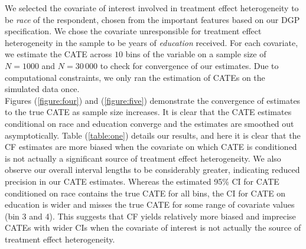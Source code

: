\documentclass[12pt]{article}
\begin{document}
We selected the covariate of interest involved in treatment effect heterogeneity
to be \textit{race} of the respondent, chosen from the important features based
on our DGP specification. We chose the covariate unresponsible for treatment
effect heterogeneity in the sample to be years of \textit{education} received.
For each covariate, we estimate the CATE across $10$ bins of the variable on a
sample size of $N = 1000$ and $N = 30\,000$ to check for convergence of our
estimates. Due to computational constraints, we only ran the estimation of CATEs
on the simulated data once. \\ 

Figures (\ref{figure:four}) and (\ref{figure:five}) demonstrate the convergence of estimates to the true CATE as
sample size increases. It is clear that the CATE estimates conditional on race
and education converge and the estimates are smoothed out asymptotically. Table (\ref{table:one}) details our results, and here it is clear that the CF estimates are more
biased when the covariate on which CATE is conditioned is not actually a
significant source of treatment effect heterogeneity. We also observe our
overall interval lengths to be considerably greater, indicating reduced
precision in our CATE estimates. Whereas the estimated 95\% CI for CATE
conditioned on race contains the true CATE for all bins, the CI for CATE on
education is wider and misses the true CATE for some range of covariate values
(bin 3 and 4). This suggests that CF yields relatively more biased and imprecise
CATEs with wider CIs when the covariate of interest is not actually the source
of treatment effect heterogeneity. \\ 
\end{document}
